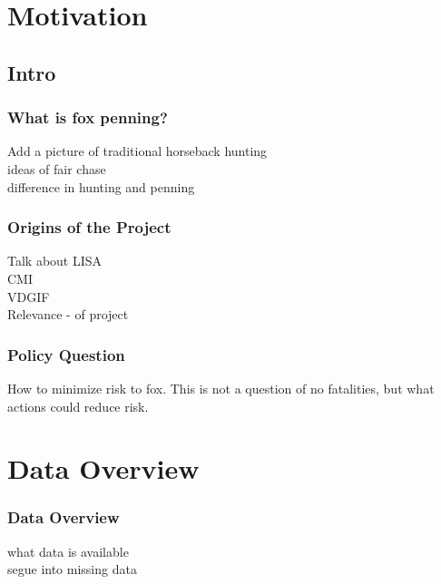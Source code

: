 \documentclass{beamer}
\begin{document}
\section{Motivation}
\subsection{Intro}
\begin{frame}
	\frametitle{What is fox penning?}
	Add a picture of traditional horseback hunting \\
	ideas of fair chase\\
	difference in hunting and penning\\
	
\end{frame}
\begin{frame}
	\frametitle{Origins of the Project}
	Talk about LISA \\
	CMI \\
	VDGIF\\
	Relevance - of project	
\end{frame}
\begin{frame}
	\frametitle{Policy Question}
	How to minimize risk to fox. This is not a question of no fatalities, but what actions could reduce risk.
\end{frame}
\section{Data Overview}
\begin{frame}
	\frametitle{Data Overview}
	what data is available \\
	segue into missing data
	\end{frame}
\end{document}
